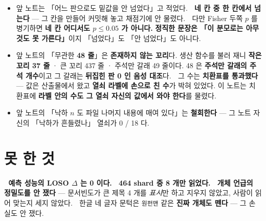 \documentclass[10pt]{article}
\begin{document}
\begin{itemize}\itemsep2pt
\item 앞 노트는 「어느 판으로도 밑값을 안 넘었다」고 적었다. 🔴 \textbf{네 칸 중 한 칸에서 넘는다}
      --- 그 칸을 만들어 커밋해 놓고 채점기에 안 물렸다. 🔴 다만 Fisher 두쪽 $p$ 를 병기하면
      \textbf{네 칸 어디서도 $p \le 0.05$ 가 아니다.} \textbf{정직한 문장은 「이 분모로는 아무것도
      못 가른다」}이지 「넘었다」도 「안 넘었다」도 아니다.
\item 앞 노트의 「무관한 \textbf{48 줄}」은 \textbf{존재하지 않는 꼬리}다.
      생산 함수를 불러 재니 \textbf{작은 꼬리 37 줄} · 큰 꼬리 437 줄 ·
      주석만 갈래 49 줄이다. 48 은 \textbf{주석만 갈래의 주석 개수}이고
      그 갈래는 \textbf{뒤집힌 판 0 인 음성 대조}다.
      🔴 그 수는 \textbf{치환표를 통과했다} --- 값은 산출물에서 왔고 \textbf{열쇠 라벨에 손으로 친 수}가
      박혀 있었다. 이 노트는 치환표에 \textbf{라벨 안의 수도 그 열쇠 자신의 값에서 와야 한다}를 물렸다.
\item 앞 노트의 「낙하 $n$ 도 파일 나머지 내용에 매여 있다」는 \textbf{철회한다} ---
      그 노트 자신의 「낙하가 흔들렸나」 열쇠가 0 / 18 다.
\end{itemize}

\section{못 한 것}

🔴 \textbf{예측 성능의 LOSO $\Delta$ 는 0 이다.} 🔴 \textbf{464 shard 중 8 개만 읽었다.}
🔴 \textbf{개체 언급의 정밀도를 안 쟀다} --- 문서빈도가 큰 제목 4 개를
\emph{표시}만 하고 지우지 않았고, 사람이 읽어 맞는지 세지 않았다.
🔴 한글 네 글자 문턱은 \texttt{원펀맨} 같은 \textbf{진짜 개체도 뗀다} --- 그 손실도 안 쟀다.
\end{document}
